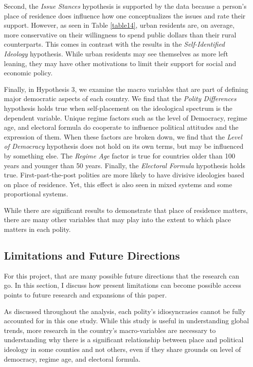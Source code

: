 \documentclass[12pt, titlepage]{article}
\newcommand\e{\emph}
\begin{document}
Second, the \e{Issue Stances} hypothesis is supported by the data because a person's place of residence does influence how one conceptualizes the issues and rate their support. However, as seen in Table \ref{table14}, urban residents are, on average, more conservative on their willingness to spend public dollars than their rural counterparts. This comes in contrast with the results in the \e{Self-Identified Ideology} hypothesis. While urban residents may see themselves as more left leaning, they may have other motivations to limit their support for social and economic policy.

Finally, in Hypothesis 3, we examine the macro variables that are part of defining major democratic aspects of each country. We find that the \e{Polity Differences} hypothesis holds true when self-placement on the ideological spectrum is the dependent variable. Unique regime factors such as the level of Democracy, regime age, and electoral formula do cooperate to influence political attitudes and the expression of them. When these factors are broken down, we find that the \e{Level of Democracy} hypothesis does not hold on its own terms, but may be influenced by something else. The \e{Regime Age} factor is true for countries older than 100 years and younger than 50 years. Finally, the \e{Electoral Formula} hypothesis holds true. First-past-the-post polities are more likely to have divisive ideologies based on place of residence. Yet, this effect is also seen in mixed systems and some proportional systems.

While there are significant results to demonstrate that place of residence matters, there are many other variables that may play into the extent to which place matters in each polity.

\subsection{Limitations and Future Directions}

For this project, that are many possible future directions that the research can go. In this section, I discuss how present limitations can become possible access points to future research and expansions of this paper.

As discussed throughout the analysis, each polity's idiosyncrasies cannot be fully accounted for in this one study. While this study is useful in understanding global trends, more research in the country's macro-variables are necessary to understanding why there is a significant relationship between place and political ideology in some counties and not others, even if they share grounds on level of democracy, regime age, and electoral formula.
\end{document}
